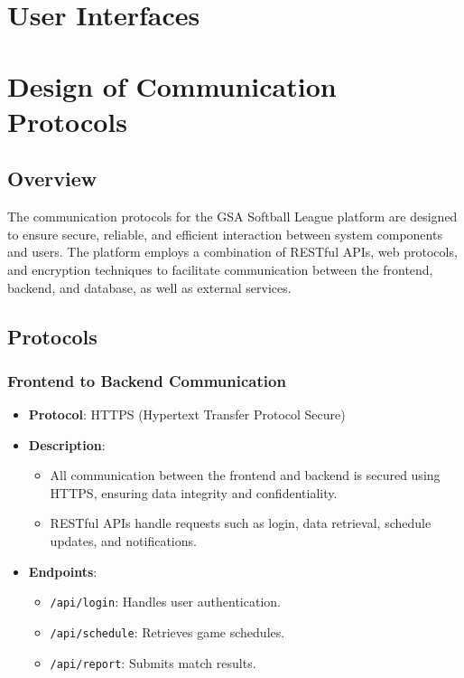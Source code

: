 \documentclass[12pt, titlepage]{article}
\begin{document}
\section{User Interfaces}


\section{Design of Communication Protocols}

\subsection*{Overview}
The communication protocols for the GSA Softball League platform are designed to ensure secure, reliable, and efficient interaction between system components and users. The platform employs a combination of RESTful APIs, web protocols, and encryption techniques to facilitate communication between the frontend, backend, and database, as well as external services.

\subsection*{Protocols}

\subsubsection*{Frontend to Backend Communication}
\begin{itemize}
    \item \textbf{Protocol}: HTTPS (Hypertext Transfer Protocol Secure)
    \item \textbf{Description}:
    \begin{itemize}
        \item All communication between the frontend and backend is secured using HTTPS, ensuring data integrity and confidentiality.
        \item RESTful APIs handle requests such as login, data retrieval, schedule updates, and notifications.
    \end{itemize}
    \item \textbf{Endpoints}:
    \begin{itemize}
        \item \texttt{/api/login}: Handles user authentication.
        \item \texttt{/api/schedule}: Retrieves game schedules.
        \item \texttt{/api/report}: Submits match results.
    \end{itemize}
\end{itemize}
\end{document}

